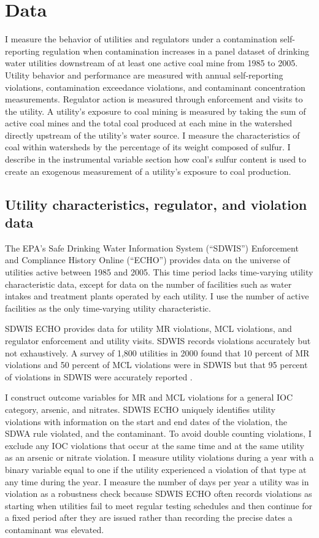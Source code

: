 \documentclass[12pt]{article}
\begin{document}
\section{Data}\label{sec:data}

I measure the behavior of utilities and regulators under a contamination self-reporting regulation when contamination increases in a panel dataset of drinking water utilities downstream of at least one active coal mine from 1985 to 2005. Utility behavior and performance are measured with annual self-reporting violations, contamination exceedance violations, and contaminant concentration measurements. Regulator action is measured through enforcement and visits to the utility. A utility's exposure to coal mining is measured by taking the sum of active coal mines and the total coal produced at each mine in the watershed directly upstream of the utility's water source. I measure the characteristics of coal within watersheds by the percentage of its weight composed of sulfur. I describe in the instrumental variable section how coal's sulfur content is used to create an exogenous measurement of a utility's exposure to coal production.

\subsection{Utility characteristics, regulator, and violation data}

The EPA's Safe Drinking Water Information System (``SDWIS'') Enforcement and Compliance History Online (``ECHO'') provides data on the universe of utilities active between 1985 and 2005. This time period lacks time-varying utility characteristic data, except for data on the number of facilities such as water intakes and treatment plants operated by each utility. I use the number of active facilities as the only time-varying utility characteristic.

SDWIS ECHO provides data for utility MR violations, MCL violations, and regulator enforcement and utility visits. SDWIS records violations accurately but not exhaustively. A survey of 1,800 utilities in 2000 found that 10 percent of MR violations and 50 percent of MCL violations were in SDWIS but that 95 percent of violations in SDWIS were accurately reported \parencite{epaviolationreliability}.

I construct outcome variables for MR and MCL violations for a general IOC category, arsenic, and nitrates. SDWIS ECHO uniquely identifies utility violations with information on the start and end dates of the violation, the SDWA rule violated, and the contaminant. To avoid double counting violations, I exclude any IOC violations that occur at the same time and at the same utility as an arsenic or nitrate violation. I measure utility violations during a year with a binary variable equal to one if the utility experienced a violation of that type at any time during the year. I measure the number of days per year a utility was in violation as a robustness check because SDWIS ECHO often records violations as starting when utilities fail to meet regular testing schedules and then continue for a fixed period after they are issued rather than recording the precise dates a contaminant was elevated. 
\end{document}
